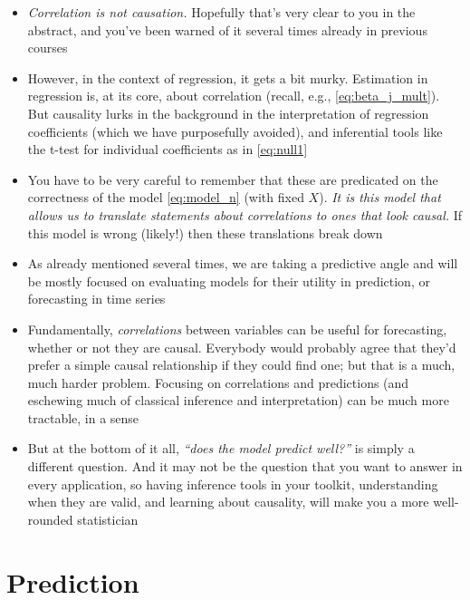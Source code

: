 \documentclass{article}
\begin{document}
\begin{itemize}
\item \emph{Correlation is not causation.} Hopefully that's very clear to you in
  the abstract, and you've been warned of it several times already in previous
  courses

\item However, in the context of regression, it gets a bit murky. Estimation in
  regression is, at its core, about correlation (recall, e.g.,
  \eqref{eq:beta_j_mult}). But causality lurks in the background in the
  interpretation of regression coefficients (which we have purposefully
  avoided), and inferential tools like the t-test for individual coefficients as
  in \eqref{eq:null1}    

\item You have to be very careful to remember that these are predicated on the
  correctness of the model \eqref{eq:model_n} (with fixed $X$). \emph{It is this
    model that allows us to translate statements about correlations to ones that
    look causal.} If this model is wrong (likely!) then these translations break
  down 

\item As already mentioned several times, we are taking a predictive angle and
  will be mostly focused on evaluating models for their utility in prediction,
  or forecasting in time series

\item Fundamentally, \emph{correlations} between variables can be useful for
  forecasting, whether or not they are causal. Everybody would probably agree
  that they'd prefer a simple causal relationship if they could find one; but
  that is a much, much harder problem. Focusing on correlations and predictions
  (and eschewing much of classical inference and interpretation) can be much
  more tractable, in a sense

\item But at the bottom of it all, \emph{``does the model predict well?''} is
  simply a different question. And it may not be the question that you want to
  answer in every application, so having inference tools in your toolkit,
  understanding when they are valid, and learning about causality, will make you
  a more well-rounded statistician
\end{itemize}

\section{Prediction}
\end{document}

